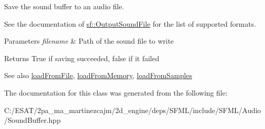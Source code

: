 Save the sound buffer to an audio file. 

See the documentation of \hyperlink{classsf_1_1_output_sound_file}{sf\+::\+Output\+Sound\+File} for the list of supported formats.


\begin{DoxyParams}{Parameters}
{\em filename} & Path of the sound file to write\\
\hline
\end{DoxyParams}
\begin{DoxyReturn}{Returns}
True if saving succeeded, false if it failed
\end{DoxyReturn}
\begin{DoxySeeAlso}{See also}
\hyperlink{classsf_1_1_sound_buffer_a2be6a8025c97eb622a7dff6cf2594394}{load\+From\+File}, \hyperlink{classsf_1_1_sound_buffer_af8cfa5599739a7edae69c5cba273d33f}{load\+From\+Memory}, \hyperlink{classsf_1_1_sound_buffer_a42d51ce4bb3b60c7ea06f63c273fd063}{load\+From\+Samples} 
\end{DoxySeeAlso}


The documentation for this class was generated from the following file\+:\begin{DoxyCompactItemize}
\item 
C\+:/\+E\+S\+A\+T/2pa\+\_\+ma\+\_\+martinezcajm/2d\+\_\+engine/deps/\+S\+F\+M\+L/include/\+S\+F\+M\+L/\+Audio/Sound\+Buffer.\+hpp\end{DoxyCompactItemize}
